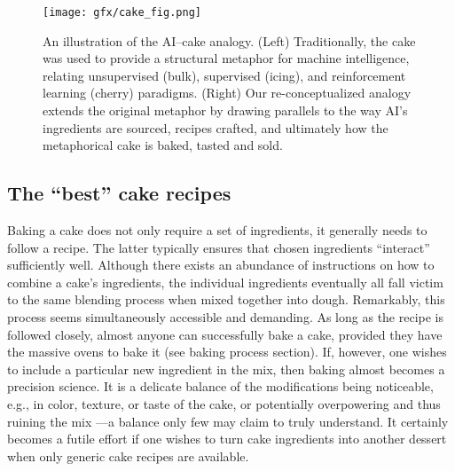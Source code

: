 \documentclass[manuscript,screen,authorversion,nonacm]{acmart}
\begin{document}
\begin{figure}
    \centering
    \texttt{[image: gfx/cake\_fig.png]}
    \caption{An illustration of the AI--cake analogy. (Left) Traditionally, the cake was used to provide a structural metaphor for machine intelligence, relating unsupervised (bulk), supervised (icing), and reinforcement learning (cherry) paradigms. (Right) Our re-conceptualized analogy extends the original metaphor by drawing parallels to the way AI's ingredients are sourced, recipes crafted, and ultimately how the metaphorical cake is baked, tasted and sold.}
    \label{fig:teaser}
\end{figure}


\subsection{The ``best'' cake recipes}
Baking a cake does not only require a set of ingredients, it generally needs to follow a recipe. The latter typically ensures that chosen ingredients ``interact'' sufficiently well. Although there exists an abundance of instructions on how to combine a cake's ingredients, the individual ingredients eventually all fall victim to the same blending process when mixed together into dough. Remarkably, this process seems simultaneously accessible and demanding. 
As long as the recipe is followed closely, almost anyone can successfully bake a cake, provided they have the massive ovens to bake it (see baking process section). 
If, however, one wishes to include a particular new ingredient in the mix, then baking almost becomes a precision science.  It is a delicate balance of the modifications being noticeable, e.g., in color, texture, or taste of the cake, or potentially overpowering and thus ruining the mix ---a balance only few may claim to truly understand. It certainly becomes a futile effort if one wishes to turn cake ingredients into another dessert when only generic cake recipes are available.
\end{document}
